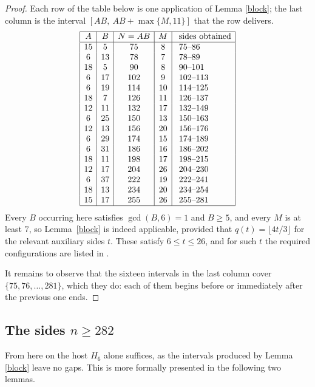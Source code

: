 \documentclass[10pt,a4paper]{article}
\theoremstyle{definition}
\begin{document}
\begin{proof}
Each row of the table below is one application of Lemma \ref{block}; the last
column is the interval $[AB,\ AB+\max\{M,11\}]$ that the row delivers.
\[
\begin{array}{|c|c|c|c|l|}
\hline
A&B&N=AB&M&\ \text{sides obtained}\\\hline
15&5&75&8&\ 75\text{--}86\\
6&13&78&7&\ 78\text{--}89\\
18&5&90&8&\ 90\text{--}101\\
6&17&102&9&\ 102\text{--}113\\
6&19&114&10&\ 114\text{--}125\\
18&7&126&11&\ 126\text{--}137\\
12&11&132&17&\ 132\text{--}149\\
6&25&150&13&\ 150\text{--}163\\
12&13&156&20&\ 156\text{--}176\\
6&29&174&15&\ 174\text{--}189\\
6&31&186&16&\ 186\text{--}202\\
18&11&198&17&\ 198\text{--}215\\
12&17&204&26&\ 204\text{--}230\\
6&37&222&19&\ 222\text{--}241\\
18&13&234&20&\ 234\text{--}254\\
15&17&255&26&\ 255\text{--}281\\\hline
\end{array}
\]
Every $B$ occurring here satisfies $\gcd(B,6)=1$ and $B\geqslant5$, and every
$M$ is at least $7$, so Lemma~\ref{block} is indeed applicable, provided that
$q(t)=\lfloor4t/3\rfloor$ for the relevant auxiliary sides $t$. These satisfy
$6\leqslant t\leqslant26$, and for such $t$ the required configurations are
listed in \cite{resta}.

It remains to observe that the sixteen intervals in the last column cover
$\{75,76,\dots,281\}$, which they do: each of them begins before or immediately after the previous
one ends.
\end{proof}

\subsection{The sides $n\geqslant282$}
\label{s53}

From here on the host $H_6$ alone suffices, as the intervals produced by
Lemma \ref{block} leave no gaps. This is more formally presented in the following two lemmas.
\end{document}
